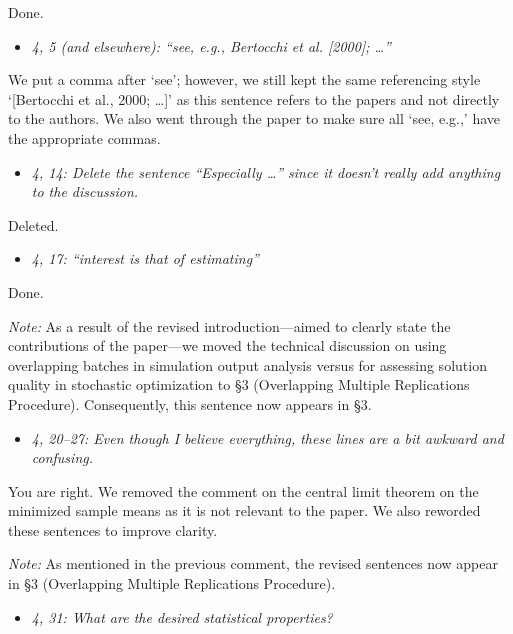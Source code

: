 \documentclass[11pt,notitlepage,onecolumn]{article}
\newcommand{\noi}{\noindent}
\begin{document}
\noi
Done. 
\medskip 


\begin{itemize}
\item[] \textit{4, 5 (and elsewhere): ``see, e.g., Bertocchi et al. [2000]; \ldots ''}
\end{itemize}

\noi
We put a comma after `see'; however, we still kept the same referencing style `[Bertocchi et al., 2000; \ldots]' as this sentence refers to the papers and not directly to the authors. 
We also went through the paper to make sure all `see, e.g.,' have the appropriate commas.
\medskip 


\begin{itemize}
\item[] \textit{4, 14: Delete the sentence ``Especially \ldots '' since it doesn't really add anything to the discussion.}
\end{itemize}

\noi
Deleted.
\medskip 


\begin{itemize}
\item[] \textit{4, 17: ``interest is that of estimating''}
\end{itemize}

\noi
Done.  
\medskip 

\noi
{\it Note:}
 As a result of the revised introduction---aimed to clearly state the contributions of the paper---we moved the technical discussion on using overlapping batches in simulation output analysis versus for assessing solution quality in stochastic optimization to \S 3 (Overlapping Multiple Replications Procedure). 
Consequently, this sentence now appears in \S 3. 
\medskip 


\begin{itemize}
\item[] \textit{4, 20--27: Even though I believe everything, these lines are a bit awkward and confusing.}
\end{itemize}

\noi
You are right. 
We removed the comment on the central limit theorem on the minimized sample means as it is not relevant to the paper. 
We also reworded these sentences to improve clarity. 
\bigskip 

\noi
{\it Note:}
As mentioned in the previous comment, the revised sentences now appear in \S 3 (Overlapping Multiple Replications Procedure). 
\medskip 


\begin{itemize}
\item[] \textit{4, 31: What are the desired statistical properties?}
\end{itemize}
\end{document}

